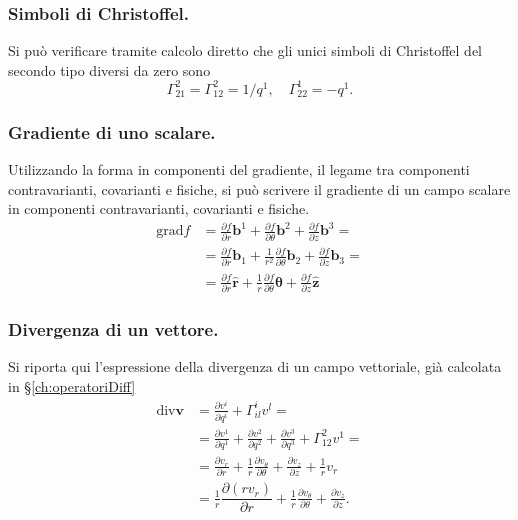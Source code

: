 \subsubsection{Simboli di Christoffel.}
 Si può verificare tramite calcolo diretto che gli unici simboli di Christoffel del secondo tipo diversi da zero sono
 \begin{equation}
  \Gamma_{21}^2 = \Gamma_{12}^2 = 1 / q^1  , \quad \Gamma_{22}^1 = -q^1 .
 \end{equation}
 
\subsubsection{Gradiente di uno scalare.}
 Utilizzando la forma in componenti del gradiente, il legame tra componenti contravarianti, covarianti e fisiche, si può
 scrivere il gradiente di un campo scalare in componenti contravarianti, covarianti e fisiche.
 \begin{equation}
 \begin{aligned}
  \text{grad} f & = \frac{\partial f}{\partial r} \bm{b}^1 + \frac{\partial f}{\partial \theta} \bm{b}^2 + \frac{\partial f}{\partial z} \bm{b}^3 = \\ 
      & = \frac{\partial f}{\partial r} \bm{b}_1 + \frac{1}{r^2}\frac{\partial f}{\partial \theta} \bm{b}_2 + \frac{\partial f}{\partial z} \bm{b}_3 = \\
      & = \frac{\partial f}{\partial r} \bm{\hat{r}} + \frac{1}{r}\frac{\partial f}{\partial \theta} \bm{\hat{\theta}}
         + \frac{\partial f}{\partial z} \bm{\hat{z}}
 \end{aligned}
 \end{equation}

\subsubsection{Divergenza di un vettore.}
 Si riporta qui l'espressione della divergenza di un campo vettoriale, già calcolata in \S\ref{ch:operatoriDiff}
 \begin{equation}
 \begin{aligned}
  \text{div} \bm{v} & = \frac{\partial v^i}{\partial q^i} + \Gamma_{il}^i v^l = \\
                    & = \frac{\partial v^1}{\partial q^1} + \frac{\partial v^2}{\partial q^2} + \frac{\partial v^3}{\partial q^3}
                       + \Gamma_{12}^2 v^1 = \\
                    & = \frac{\partial v_r}{\partial r} + \frac{1}{r}\frac{\partial v_\theta}{\partial \theta} + \frac{\partial v_z}{\partial z}
                       + \frac{1}{r} v_r \\
                    & = \frac{1}{r}\dfrac{\partial (r v_r)}{\partial r} + \frac{1}{r}\frac{\partial v_\theta}{\partial \theta} +
                        \frac{\partial v_z}{\partial z} .
 \end{aligned}
 \end{equation}
 
